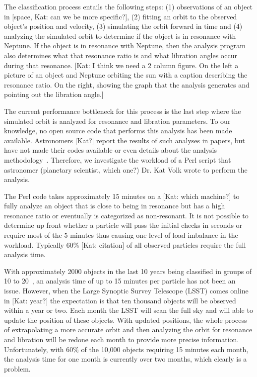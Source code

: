 \documentclass[conference]{IEEEtran}
\begin{document}
The classification process entails the following steps:
(1) observations of an object in [space, Kat: can we be more specific?],
(2) fitting an orbit to the observed object's position and velocity,
(3) simulating the orbit forward in time 
and
(4) analyzing the simulated orbit to determine if the object is
in resonance with Neptune.
If the object is in resonance with Neptune, then the analysis
program also determines what that resonance ratio is
and what libration angles occur during that resonance.
[Kat: I think we need a 2 column figure.  On the left a picture of 
an object and Neptune orbiting the sun with a caption describing
the resonance ratio.  On the right, showing the graph that the 
analysis generates and pointing out the libration angle.]

The current performance bottleneck for this process is the
last step where the simulated orbit is analyzed for resonance
and libration parameters.
To our knowledge, no open source code that performs this
analysis has been made available.  Astronomers [Kat?] report
the results of such analyses in papers, but have not made their
codes available or even details about the analysis 
methodology~\cite{AnalysisResultsCitations}.
Therefore, we investigate the workload of a Perl script
that astronomer (planetary scientist, which one?) 
Dr. Kat Volk wrote to perform the analysis.

The Perl code takes approximately 15 minutes on a [Kat: which machine?]
to fully analyze an object that is close to being in resonance but has a high
resonance ratio or eventually is categorized as non-resonant.
It is not possible to determine up front whether a particle will pass
the initial checks in seconds or require most of the 5 minutes
thus causing one level of load imbalance in the workload.
Typically 60\% [Kat: citation] of all observed particles require
the full analysis time.

With approximately
2000 objects in the last 10 years being classified in
groups of 10 to 20~\cite{ClassificationCite}, an analysis time
of up to 15 minutes per particle has not been an issue.
However, when the Large Synoptic Survey Telescope (LSST) comes 
online in  [Kat: year?] the expectation is that ten thousand objects
will be observed within a year or two.
Each month the LSST will scan the full sky and will able to update
the position of these objects.  With updated positions, the 
whole process of extrapolating a more accurate orbit and then 
analyzing the orbit for resonance and libration will be redone
each month to provide more precise information.
Unfortunately, with 60\% of the 10,000 objects requiring 15 minutes
each month, the analysis time for one month is currently over two months,
which clearly is a problem.
\end{document}
